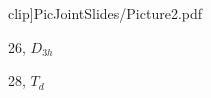 \documentclass{beamer}
\begin{document}
\begin{frame}
\begin{center}
\begin{minipage}[b]{24mm}
{clip]{PicJointSlides/Picture2.pdf}}\par
26, $D_{3h}$
\end{minipage}
\begin{minipage}[b]{24mm}
\centering
{}\par
28, $T_{d}$
\end{minipage}
\end{center}


\end{frame}
\end{document}
